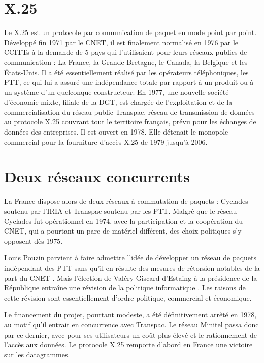 \documentclass[12pt]{report}
\begin{document}
\section{X.25}

Le X.25 est un protocole par communication de paquet en mode point par point\cite{wikix25}. Développé fin 1971 par le \gls{CNET}, il est finalement normalisé en 1976 par le \glspl{CCITT} à la demande de 5 pays qui l'utilisaient pour leurs réseaux publics de communication : La France, la Grande-Bretagne, le Canada, la Belgique et les États-Unis. Il a été essentiellement réalisé par les opérateurs téléphoniques, les \gls{PTT}, ce qui lui a assuré une indépendance totale par rapport à un produit ou à un système d'un quelconque constructeur. En 1977, une nouvelle société d'économie mixte, filiale de la DGT, est chargée de l'exploitation et de la commercialisation du réseau public Transpac, réseau de transmission de données au protocole X.25 couvrant tout le territoire français, prévu pour les échanges de données des entreprises. Il est ouvert en 1978. Elle détenait le monopole commercial pour la fourniture d'accès X.25 de 1979 jusqu'à 2006\cite{wikitranspac}.

\section{Deux réseaux concurrents}

La France dispose alors de deux réseaux à commutation de paquets : Cyclades soutenu par l'IRIA et Transpac soutenu par les PTT. Malgré que le réseau Cyclades fut opérationnel en 1974, avec la participation et la coopération du CNET, qui a pourtant un parc de matériel différent, des choix politiques s'y opposent dès 1975.

Louis Pouzin parvient à faire admettre l'idée de développer un réseau de paquets indépendant des PTT \og sans qu'il en résulte des mesures de rétorsion notables de la part du CNET \fg. Mais l'élection de Valéry Giscard d'Estaing à la présidence de la République entraîne \og une révision de la politique informatique \fg. Les raisons de cette révision sont essentiellement d'ordre politique, commercial et économique.

Le financement du projet, pourtant modeste, a été définitivement arrêté en 1978, au motif qu'il entrait en concurrence avec Transpac. Le réseau Minitel passa donc par ce dernier, avec pour ses utilisateurs un coût plus élevé et le rationnement de l'accès aux données. Le protocole X.25 remporte d'abord en France une victoire sur les datagrammes\cite{wikicyc}.
\end{document}
